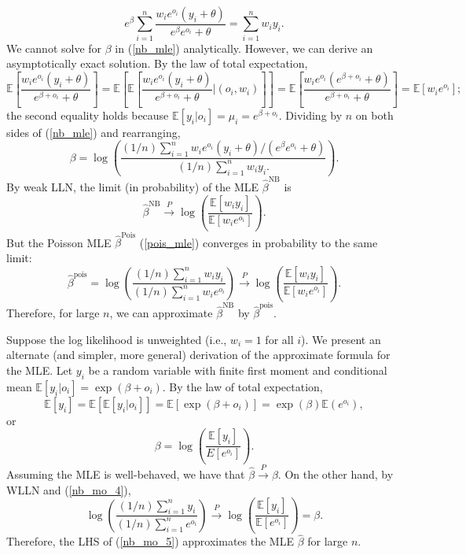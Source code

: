 \documentclass[12pt]{article}
\begin{document}
\begin{appendices}
\begin{refsection}
		\begin{equation}\label{nb_mle}
		e^\beta \sum_{i=1}^n \frac{w_i e^{o_i} (y_i + \theta)}{e^\beta e^{o_i} + \theta} = \sum_{i=1}^n w_i y_i.
		\end{equation}
		We cannot solve for $\beta$ in (\ref{nb_mle}) analytically. However, we can derive an asymptotically exact solution. By the law of total expectation,
		$$ \mathbb{E} \left[\frac{w_i  e^{o_i} (y_i + \theta)}{e^{\beta + o_i} + \theta} \right] = \mathbb{E} \left[\mathbb{E}\left[\frac{w_i e^{o_i} (y_i + \theta) }{e^{\beta + o_i} + \theta} \bigg| (o_i, w_i) \right] \right] = \mathbb{E} \left[\frac{w_i e^{o_i} (e^{\beta + o_i} + \theta)}{ e^{\beta + o_i} + \theta} \right] = \mathbb{E} [w_i e^{o_i}];
		$$
		the second equality holds because $\mathbb{E}[y_i | o_i ] = \mu_i = e^{\beta + o_i}.$ Dividing by $n$ on both sides of (\ref{nb_mle}) and rearranging,
		\begin{equation}\label{nb_mo_3}
		\beta = \log\left( \frac{ (1/n) \sum_{i=1}^n w_i e^{o_i} (y_i + \theta)/(e^\beta e^{o_i} + \theta)}{ (1/n) \sum_{i=1}^n w_i y_i. } \right).
		\end{equation}
		By weak LLN, the limit (in probability) of the MLE $\hat{\beta}^\textrm{NB}$ is
		\begin{equation}
		\hat{\beta}^{\textrm{NB}} \xrightarrow{P} \log\left(\frac{\mathbb{E}[w_i y_i]}{\mathbb{E}[w_i e^{o_i}]} \right).
		\end{equation}
		But the Poisson MLE $\hat{\beta}^{\textrm{Pois}}$ (\ref{pois_mle}) converges in probability to the same limit:
		$$ \hat{\beta}^{\textrm{pois}} =  \log \left(\frac{ (1/n) \sum_{i=1}^n w_i y_i}{(1/n)\sum_{i=1}^n w_i e^{o_i}} \right) \xrightarrow{P} \log \left(\frac{\mathbb{E}[w_i y_i]}{ \mathbb{E}[w_i e^{o_i}]} \right).$$ Therefore, for large $n$, we can approximate $\hat{\beta}^{\textrm{NB}}$ by $\hat{\beta}^{\textrm{pois}}$.
		
		Suppose the log likelihood is unweighted (i.e., $w_i = 1$ for all $i$). We present an alternate (and simpler, more general) derivation of the approximate formula for the MLE. Let $y_i$ be a random variable with finite first moment and conditional mean $\mathbb{E}[y_i | o_i] = \exp(\beta + o_i).$ By the law of total expectation,
		$$ \mathbb{E}[y_i] = \mathbb{E}[\mathbb{E}[ y_i | o_i]] = \mathbb{E}[\exp(\beta + o_i)] = \exp(\beta) \mathbb{E}(e^{o_i}),$$ or
		\begin{equation}\label{nb_mo_4}
		\beta = \log\left(\frac{\mathbb{E}[y_i]}{E[e^{o_i}]} \right).
		\end{equation}
		Assuming the MLE is well-behaved, we have that $\hat{\beta} \xrightarrow{P} \beta.$ On the other hand, by WLLN and (\ref{nb_mo_4}),
		\begin{equation}\label{nb_mo_5}
		\log\left( \frac{(1/n) \sum_{i=1}^n y_i }{(1/n) \sum_{i=1}^n e^{o_i}} \right) \xrightarrow{P}  \log\left(\frac{ \mathbb{E}[y_i] }{ \mathbb{E}[e^{o_i}] } \right) = \beta.
		\end{equation}
		Therefore, the LHS of (\ref{nb_mo_5}) approximates the MLE $\hat{\beta}$ for large $n$.
		

\end{refsection}
\end{appendices}
\end{document}
